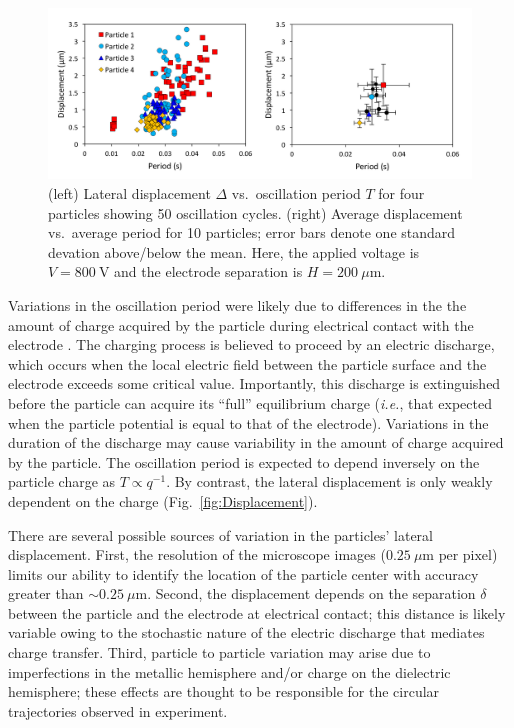 \begin{appendices}
\begin{figure}[h]
    \centering
    \includegraphics[width=\textwidth]{figures/A1_VariationPlots.png}
    \caption{(left) Lateral displacement $\Delta$ vs.~oscillation period $T$ for four particles showing 50 oscillation cycles. (right) Average displacement vs.~average period for 10 particles; error bars denote one standard devation above/below the mean. Here, the applied voltage is $V=800~\text{V}$ and the electrode separation is $H=200~\mu\text{m}$.}
    \label{fig:Variations}
\end{figure}

Variations in the oscillation period were likely due to differences in the the amount of charge acquired by the particle during electrical contact with the electrode \autocite{drews2015contact}.
The charging process is believed to proceed by an electric discharge, which occurs when the local electric field between the particle surface and the electrode exceeds some critical value.
Importantly, this discharge is extinguished before the particle can acquire its ``full'' equilibrium charge (\emph{i.e.}, that expected when the particle potential is equal to that of the electrode).
Variations in the duration of the discharge may cause variability in the amount of charge acquired by the particle.
The oscillation period is expected to depend inversely on the particle charge as $T\propto q^{-1}$.
By contrast, the lateral displacement is only weakly dependent on the charge (Fig.~\ref{fig:Displacement}).

There are several possible sources of variation in the particles' lateral displacement.
First, the resolution of the microscope images ($0.25~\mu\text{m per pixel}$) limits our ability to identify the location of the particle center with accuracy greater than ${\sim}0.25~\mu\text{m}$.
Second, the displacement depends on the separation $\delta$ between the particle and the electrode at electrical contact; this distance is likely variable owing to the stochastic nature of the electric discharge that mediates charge transfer.
Third, particle to particle variation may arise due to imperfections in the metallic hemisphere and/or charge on the dielectric hemisphere; these effects are thought to be responsible for the circular trajectories observed in experiment.


\end{appendices}
